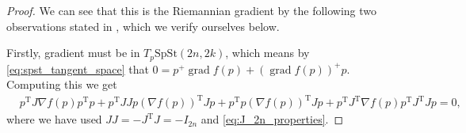 \begin{proof}
    We can see that this is the Riemannian gradient by the following two observations stated in \cite{BZ}, which we verify ourselves below.

    Firstly, gradient must be in $T_{p}\mathrm{SpSt}(2n, 2k)$, which means by \eqref{eq:spst_tangent_space} that $0=p^{+}\operatorname{grad}f(p)+(\operatorname{grad}f(p))^{+}p$. Computing this we get 
    \begin{equation*}
        \begin{split}
        &p^{\mathrm{T}}J\nabla f(p)p^{\mathrm{T}}p+p^{\mathrm{T}}JJp(\nabla f(p))^{\mathrm{T}}Jp+p^{\mathrm{T}}p(\nabla f(p))^{\mathrm{T}}Jp+p^{\mathrm{T}}J^{\mathrm{T}}\nabla f(p)p^{\mathrm{T}}J^{\mathrm{T}}Jp=0,
        \end{split}
    \end{equation*}
    where we have used $JJ=-J^{\mathrm{T}}J=-I_{2n}$ and \eqref{eq:J_2n_properties}.
    

\end{proof}
